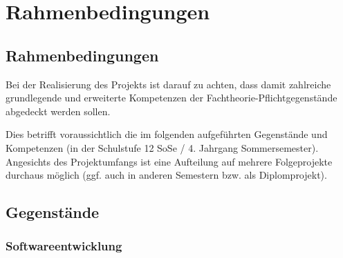 
\part{Rahmenbedingungen}



\chapter{Rahmenbedingungen}

Bei der Realisierung des Projekts ist darauf zu achten, dass damit zahlreiche grundlegende und erweiterte Kompetenzen der Fachtheorie-Pflichtgegenstände abgedeckt werden sollen.

Dies betrifft voraussichtlich die im folgenden aufgeführten Gegenstände und Kompetenzen (in der Schulstufe 12 SoSe / 4. Jahrgang Sommersemester).
Angesichts des Projektumfangs ist eine Aufteilung auf mehrere Folgeprojekte durchaus möglich (ggf. auch in anderen Semestern bzw. als Diplomprojekt).


\chapter{Gegenstände}

\section{Softwareentwicklung}



